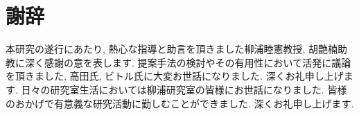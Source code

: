 \chapter*{謝辞}
本研究の遂行にあたり, 熱心な指導と助言を頂きました柳浦睦憲教授, 胡艶楠助教に深く感謝の意を表します.
提案手法の検討やその有用性において活発に議論を頂きました, 高田氏, ビトル氏に大変お世話になりました. 深くお礼申し上げます.
日々の研究室生活においては柳浦研究室の皆様にお世話になりました. 
皆様のおかげで有意義な研究活動に勤しむことができました. 深くお礼申し上げます.

